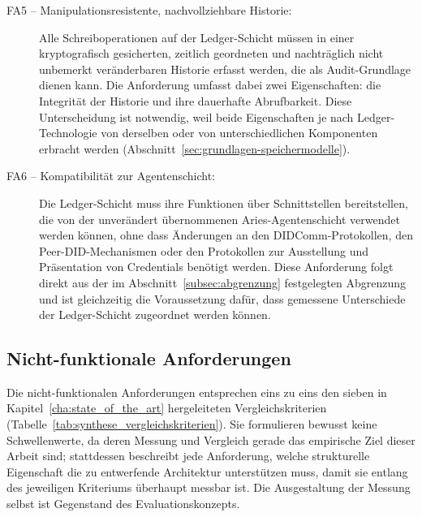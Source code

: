 \begin{description}
  \item[FA5 -- Manipulationsresistente, nachvollziehbare Historie:] Alle Schreiboperationen auf der Ledger-Schicht müssen in einer kryptografisch gesicherten, zeitlich geordneten und nachträglich nicht unbemerkt veränderbaren Historie erfasst werden, die als Audit-Grundlage dienen kann. Die Anforderung umfasst dabei zwei Eigenschaften: die Integrität der Historie und ihre dauerhafte Abrufbarkeit. Diese Unterscheidung ist notwendig, weil beide Eigenschaften je nach Ledger-Technologie von derselben oder von unterschiedlichen Komponenten erbracht werden (Abschnitt~\ref{sec:grundlagen-speichermodelle}).
  \item[FA6 -- Kompatibilität zur Agentenschicht:] Die Ledger-Schicht muss ihre Funktionen über Schnittstellen bereitstellen, die von der unverändert übernommenen Aries-Agentenschicht verwendet werden können, ohne dass Änderungen an den DIDComm-Protokollen, den Peer-DID-Mechanismen oder den Protokollen zur Ausstellung und Präsentation von Credentials benötigt werden. Diese Anforderung folgt direkt aus der im Abschnitt~\ref{subsec:abgrenzung} festgelegten Abgrenzung und ist gleichzeitig die Voraussetzung dafür, dass gemessene Unterschiede der Ledger-Schicht zugeordnet werden können.
\end{description}

\subsection{Nicht-funktionale Anforderungen}
\label{subsec:nichtfunktionale-anforderungen}

Die nicht-funktionalen Anforderungen entsprechen eins zu eins den sieben in Kapitel~\ref{cha:state_of_the_art} hergeleiteten Vergleichskriterien (Tabelle~\ref{tab:synthese_vergleichskriterien}). Sie formulieren bewusst keine Schwellenwerte, da deren Messung und Vergleich gerade das empirische Ziel dieser Arbeit sind; stattdessen beschreibt jede Anforderung, welche strukturelle Eigenschaft die zu entwerfende Architektur unterstützen muss, damit sie entlang des jeweiligen Kriteriums überhaupt messbar ist. Die Ausgestaltung der Messung selbst ist Gegenstand des Evaluationskonzepts.



